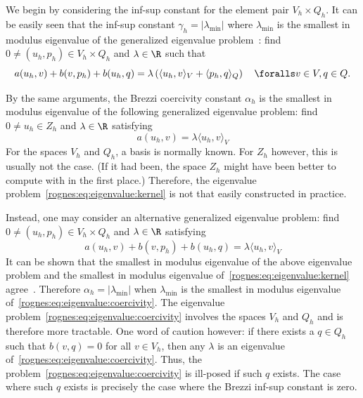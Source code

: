 We begin by considering the \babuska{} inf-sup constant for the
element pair $V_h \times Q_h$. It can be easily seen that
the \babuska{} inf-sup constant $\gamma_h = |\lambda_{\min}|$ where
$\lambda_{\min}$ is the smallest in modulus eigenvalue of the
generalized eigenvalue problem~\citep{ArnoldRognes2009, Malkus1981}:
find $0 \not = (u_h, p_h) \in V_h \times Q_h$ and $\lambda \in \R$
such that
\begin{equation}
  \label{rognes:eq:eigenvalue:babuska}
  a(u_h, v) + b(v, p_h) + b(u_h, q)
  = \lambda
  \left (\langle u_h, v \rangle_{V} + \langle p_h, q \rangle_{Q} \right )
  \quad \foralls v \in V, q \in Q.
\end{equation}

By the same arguments, the Brezzi coercivity constant $\alpha_h$ is
the smallest in modulus eigenvalue of the following generalized
eigenvalue problem: find $0 \not = u_h \in Z_h$ and $\lambda \in \R$
satisfying
\begin{equation}
  \label{rognes:eq:eigenvalue:kernel}
  a(u_h, v) = \lambda \langle u_h, v \rangle_{V}
\end{equation}
For the spaces $V_h$ and $Q_h$, a basis is normally known. For $Z_h$
however, this is usually not the case. (If it had been, the space
$Z_h$ might have been better to compute with in the first place.)
Therefore, the eigenvalue problem~\eqref{rognes:eq:eigenvalue:kernel} is not
that easily constructed in practice.

Instead, one may consider an alternative generalized eigenvalue
problem: find $0 \not = (u_h, p_h) \in V_h \times Q_h$ and $\lambda
\in \R$ satisfying
\begin{equation}
  \label{rognes:eq:eigenvalue:coercivity}
  a(u_h, v) + b(v, p_h) + b(u_h, q) = \lambda \langle u_h, v \rangle_{V}
\end{equation}
It can be shown that the smallest in modulus eigenvalue of the above
eigenvalue problem and the smallest in modulus eigenvalue
of~\eqref{rognes:eq:eigenvalue:kernel}
agree~\citep{ArnoldRognes2009}. Therefore $\alpha_h = |\lambda_{\min}|$
when $\lambda_{\min}$ is the smallest in modulus eigenvalue
of~\eqref{rognes:eq:eigenvalue:coercivity}. The eigenvalue
problem~\eqref{rognes:eq:eigenvalue:coercivity} involves the spaces
$V_h$ and $Q_h$ and is therefore more tractable. One word of caution
however: if there exists a $q \in Q_h$ such that $b(v, q) = 0$ for all
$v \in V_h$, then any $\lambda$ is an eigenvalue
of~\eqref{rognes:eq:eigenvalue:coercivity}. Thus, the
problem~\eqref{rognes:eq:eigenvalue:coercivity} is ill-posed if such
$q$ exists. The case where such $q$ exists is precisely the case where
the Brezzi inf-sup constant is zero.

